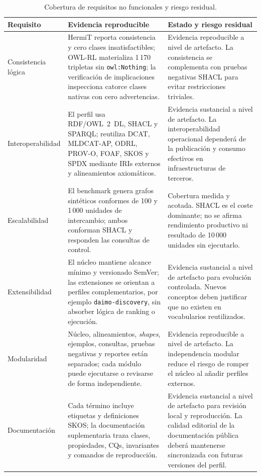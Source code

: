 \documentclass[Afour,sagev,times]{sagej}
\newcommand{\code}[1]{\texttt{#1}}
\begin{document}
\begin{table}[tb]
\scriptsize\sf\centering
\caption{Cobertura de requisitos no funcionales y riesgo residual.\label{tab:nfr-coverage}}
\begin{tabular}{@{}p{2.7cm}p{8.0cm}p{4.0cm}@{}}
\toprule
\textbf{Requisito} & \textbf{Evidencia reproducible} & \textbf{Estado y riesgo residual} \\
\midrule
Consistencia lógica & HermiT reporta consistencia y cero clases insatisfactibles; OWL-RL materializa 1\,170 tripletas sin \code{owl:Nothing}; la verificación de implicaciones inspecciona catorce clases nativas con cero advertencias. & Evidencia reproducible a nivel de artefacto. La consistencia se complementa con pruebas negativas SHACL para evitar restricciones triviales. \\
Interoperabilidad & El perfil usa RDF/OWL~2~DL, SHACL y SPARQL; reutiliza DCAT, MLDCAT-AP, ODRL, PROV-O, FOAF, SKOS y SPDX mediante IRIs externos y alineamientos axiomáticos. & Evidencia sustancial a nivel de artefacto. La interoperabilidad operacional dependerá de la publicación y consumo efectivos en infraestructuras de terceros. \\
Escalabilidad & El benchmark genera grafos sintéticos conformes de 100 y 1\,000 unidades de intercambio; ambos conforman SHACL y responden las consultas de control. & Cobertura medida y acotada. SHACL es el coste dominante; no se afirma rendimiento productivo ni resultado de 10\,000 unidades sin ejecutarlo. \\
Extensibilidad & El núcleo mantiene alcance mínimo y versionado SemVer; las extensiones se orientan a perfiles complementarios, por ejemplo \code{daimo-discovery}, sin absorber lógica de ranking o ejecución. & Evidencia sustancial a nivel de artefacto para evolución controlada. Nuevos conceptos deben justificar que no existen en vocabularios reutilizados. \\
Modularidad & Núcleo, alineamientos, \emph{shapes}, ejemplos, consultas, pruebas negativas y reportes están separados; cada módulo puede ejecutarse o revisarse de forma independiente. & Evidencia reproducible a nivel de artefacto. La independencia modular reduce el riesgo de romper el núcleo al añadir perfiles externos. \\
Documentación & Cada término incluye etiquetas y definiciones SKOS; la documentación suplementaria traza clases, propiedades, CQs, invariantes y comandos de reproducción. & Evidencia sustancial a nivel de artefacto para revisión local y reproducción. La calidad editorial de la documentación pública deberá mantenerse sincronizada con futuras versiones del perfil. \\
\bottomrule
\end{tabular}
\end{table}
\end{document}
